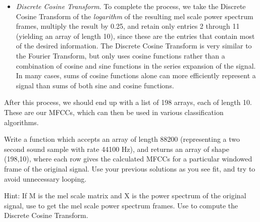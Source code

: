\begin{itemize}
\item \emph{Discrete Cosine Transform}. To complete the process, we take the Discrete Cosine Transform
of the \emph{logarithm} of the resulting mel scale power spectrum frames, multiply the result by 0.25, and retain only entries 2
through 11 (yielding an array of length 10), since these are the entries that contain most of the desired information.
The Discrete Cosine Transform is very similar to the Fourier Transform, but only uses
cosine functions rather than a combination of cosine and sine functions in the series expansion of the signal.
In many cases, sums of cosine functions alone can more efficiently represent a signal than
sums of both sine and cosine functions.
\end{itemize}


After this process, we should end up with a list of 198 arrays, each of length 10. These are our MFCCs,
which can then be used in various classification algorithms.

\begin{problem}
Write a function  which accepts an array of length 88200 (representing a two second sound sample
with rate 44100 Hz), and returns an array of shape (198,10), where each row gives the calculated MFCCs for
a particular windowed frame of the original signal.
Use your previous solutions as you see fit, and try to avoid unnecessary looping.

Hint: If M is the mel scale matrix and X is the power spectrum of the original signal, use  to get the mel scale power spectrum frames.
Use  to compute the Discrete Cosine Transform.
\end{problem}

